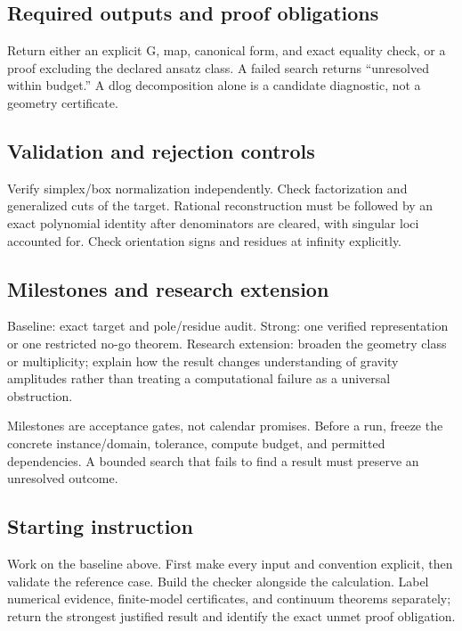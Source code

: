 \documentclass[
  11pt,
]{article}
\begin{document}
\subsection{Required outputs and proof obligations}

Return either an explicit G, map, canonical form, and exact equality
check, or a proof excluding the declared ansatz class. A failed search
returns ``unresolved within budget.'' A dlog decomposition alone is a
candidate diagnostic, not a geometry certificate.

\subsection{Validation and rejection controls}

Verify simplex/box normalization independently. Check factorization and
generalized cuts of the target. Rational reconstruction must be followed
by an exact polynomial identity after denominators are cleared, with
singular loci accounted for. Check orientation signs and residues at
infinity explicitly.

\subsection{Milestones and research extension}

Baseline: exact target and pole/residue audit. Strong: one verified
representation or one restricted no-go theorem. Research extension:
broaden the geometry class or multiplicity; explain how the result
changes understanding of gravity amplitudes rather than treating a
computational failure as a universal obstruction.

Milestones are acceptance gates, not calendar promises. Before a run,
freeze the concrete instance/domain, tolerance, compute budget, and
permitted dependencies. A bounded search that fails to find a result
must preserve an unresolved outcome.

\subsection{Starting instruction}

Work on the baseline above. First make every input and convention
explicit, then validate the reference case. Build the checker alongside
the calculation. Label numerical evidence, finite-model certificates,
and continuum theorems separately; return the strongest justified result
and identify the exact unmet proof obligation.
\end{document}
